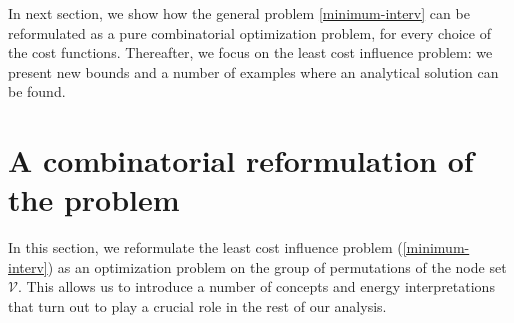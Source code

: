 \documentclass[12pt,twoside,reqno]{amsart}
\theoremstyle{definition}
\numberwithin{equation}{section}
\newcommand{\mc}{\mathcal}
\newcommand{\0}{\mathbf{0}}
\newcommand{\1}{\mathbf{1}}
\begin{document}
In next section, we show how the general problem \eqref{minimum-interv} can be reformulated as a pure combinatorial optimization problem, for every choice of the cost functions. Thereafter, we focus on the least cost influence problem: we present new bounds and a number of examples where an analytical solution can be found.


\section{A combinatorial reformulation of the problem}
In this section, we reformulate the least cost influence problem (\ref{minimum-interv}) as an optimization problem on the group of permutations of the node set $\mc V$. This allows us to introduce a number of concepts and energy interpretations that turn out to play a crucial role in the rest of our analysis.
\end{document}
